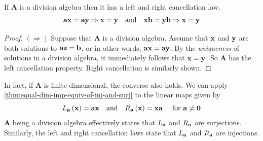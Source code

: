 \begin{lemma}
    If \( \mathbf{A} \) is a division algebra then it has a left and right cancellation law. 
    \[ \vb{a} \vb{x} = \vb{a} \vb{y} \Rightarrow \vb{x} = \vb{y} \quad \text{and} \quad  \vb{x} \vb{b} = \vb{y} \vb{b} \Rightarrow \vb{x} = \vb{y} \]
\end{lemma}
\begin{proof}
    \( \left( \Rightarrow \right) \) Suppose that \( \mathbf{A} \) is a division algebra. Assume that \( \vb{x} \) and \( \vb{y} \) are both solutions to \( \vb{a} \vb{z} = \vb{b} \), or in other words, \( \vb{a} \vb{x} = \vb{a} \vb{y} \). By the \emph{uniqueness} of solutions in a division algebra, it immediately follows that \( \vb{x} = \vb{y} \). So \( \mathbf{A} \) has the left cancellation property. Right cancellation is similarly shown. 
\end{proof}
\begin{altproof}
    In fact, if \( \mathbf{A} \) is finite-dimensional, the converse also holds. We can apply \cref{thm:equal-dim-imp-equiv-of-inj-and-surj} to the linear maps given by 
    \[ L_{\vb{a}} \left( \vb{x} \right) = \vb{a} \vb{x} \quad \text{and} \quad R_{\vb{a}} \left( \vb{x} \right) =  \vb{x} \vb{a} \quad \text{ for } \vb{a} \neq \vb{0} \]
    \( \mathbf{A} \) being a division algebra effectively states that \( L_{\vb{a}} \) and \( R_{\vb{a}} \) are surjections. Similarly, the left and right cancellation laws state that \( L_{\vb{a}} \) and \( R_{\vb{a}} \) are injections.
\end{altproof}



